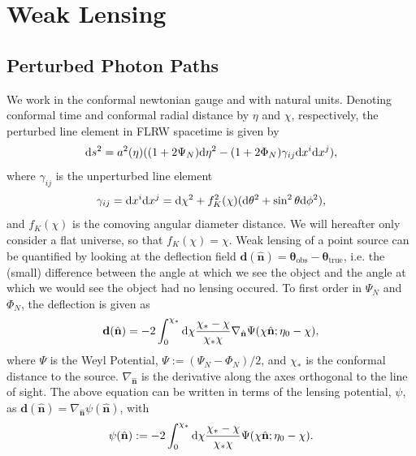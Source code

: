 \documentclass[11pt]{article} %
\DeclareRobustCommand{\d}{\ifmmode\text{d}\else d\fi}
\begin{document}
\pagebreak
\printbibliography

\appendix

\section{Weak Lensing}\label{sec:weaklensing}
\subsection{Perturbed Photon Paths}
We work in the conformal newtonian gauge and with natural units. Denoting conformal time and conformal radial distance by $\eta$ and $\chi$, respectively, the perturbed line element in FLRW spacetime is given by
\begin{equation}
    \d s^2 = a^2(\eta)((1 + 2\Psi_N) \d \eta^2 - (1 + 2\Phi_N) \gamma_{ij}\d x^i \d x^j),
\end{equation}
where $\gamma_{ij}$ is the unperturbed line element
\begin{equation}
    \gamma_{ij} = \d x^i \d x^j = \d \chi^2 + f^2_K(\chi)(\d \theta^2 + \sin ^2 \theta \d \phi ^2),
\end{equation}
and $f_K(\chi)$ is the comoving angular diameter distance. We will hereafter only consider a flat universe, so that $f_K(\chi) = \chi$. Weak lensing of a point source can be quantified by looking at the deflection field $\mathbf d (\hat{\mathbf n}) = \mathbf \theta_{\text{obs}} - \mathbf \theta_{\text{true}}$, i.e. the (small) difference between the angle at which we see the object and the angle at which we would see the object had no lensing occured. To first order in $\Psi_N$ and $\Phi_N$, the deflection is given as \cite{dodelson2020modern}
\begin{equation}
    \mathbf d(\hat{\mathbf n}) = -2 \int_0^{\chi_*}\d \chi \frac{\chi_* - \chi}{\chi_*\chi}\nabla_{\hat{\mathbf n}}\Psi(\chi\hat{\mathbf n};\eta_0 - \chi),
\end{equation}
where $\Psi$ is the Weyl Potential, $\Psi := (\Psi_N - \Phi_N)/2$, and $\chi_*$ is the conformal distance to the source. $\nabla_{\hat{\mathbf n}}$ is the derivative along the axes orthogonal to the line of sight. The above equation can be written in terms of the lensing potential, $\psi$, as $\mathbf d (\hat{\mathbf n}) = \nabla_{\hat{\mathbf n}} \psi(\hat{\mathbf n})$, with
\begin{equation}
    \psi(\hat {\mathbf n}) := -2 \int_0^{\chi_*}\d \chi \frac{\chi_* - \chi}{\chi_*\chi}\Psi(\chi\hat{\mathbf n};\eta_0 - \chi).
\end{equation}
\end{document}
